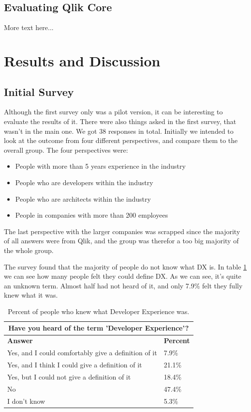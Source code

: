 \documentclass{article}
\begin{document}
\subsection{Evaluating Qlik Core}

More text here...

\section{Results and Discussion}

\subsection{Initial Survey}
Although the first survey only was a pilot version, it can be interesting to evaluate the results of it. There were also things asked in the first survey, that wasn't in the main one. We got 38 responses in total.
Initially we intended to look at the outcome from four different perspectives, and compare them to the overall group. The four perspectives were:
\begin{itemize}[label={}]
\item People with more than 5 years experience in the industry
\item People who are developers within the industry
\item People who are architects within the industry
\item People in companies with more than 200 employees
\end{itemize}
The last perspective with the larger companies was
scrapped since the majority of all answers were from Qlik, and the group
was therefor a too big majority of the whole group.

The survey found that the majority of people do not know what DX is. In table \ref{tab:knowdx} we can see how many people felt they could define DX. As we can see, it's quite an unknown term. Almost half had not heard of it, and only 7.9\% felt they fully knew what it was.

\begin{table}[H]
\centering
\begin{tabularx}{\columnwidth}{X|l}
\multicolumn{2}{c}{\textbf{Have you heard of the term 'Developer Experience'?}} \\ \hline \hline
\textbf{Answer} & \textbf{Percent} \\ \hline
Yes, and I could comfortably give a definition of it & 7.9\%  \\ \hline
Yes, and I think I could give a definition of it & 	21.1\%  \\ \hline
Yes, but I could not give a definition of it &	18.4\%  \\ \hline
No &	47.4\%  \\ \hline
I don't know & 5.3\% \\ \hline
\end{tabularx}
\caption{Percent of people who knew what Developer Experience was.}
\label{tab:knowdx}
\end{table}
\end{document}
